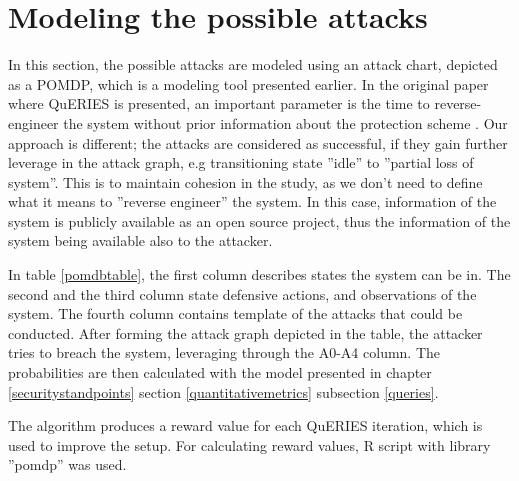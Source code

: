 \section{Modeling the possible attacks}

In this section, the possible attacks are modeled using an attack
chart, depicted as a POMDP, which is a modeling tool presented earlier. In the
original paper where QuERIES is presented, an important parameter is
the time to reverse-engineer the system without prior information
about the protection scheme \cite{carin2008cybersecurity}. Our
approach is different; the attacks are considered as successful, if
they gain further leverage in the attack graph, e.g transitioning
state ''idle'' to ''partial loss of system''. This is to maintain
cohesion in the study, as we don't need to define what it means to
''reverse engineer'' the system. In this case, information of the
system is publicly available as an open source project, thus the
information of the system being available also to the attacker.

In table \ref{pomdbtable}, the first column describes states the
system can be in. The second and the third column state defensive
actions, and observations of the system. The fourth column contains
template of the attacks that could be conducted. After forming the
attack graph depicted in the table, the attacker tries to breach the
system, leveraging through the A0-A4 column. The probabilities are
then calculated with the model presented in chapter
\ref{securitystandpoints} section \ref{quantitativemetrics} subsection
\ref{queries}.

The algorithm produces a reward value for each QuERIES iteration,
which is used to improve the setup. For calculating reward values, R
script with library ''pomdp'' was used.

